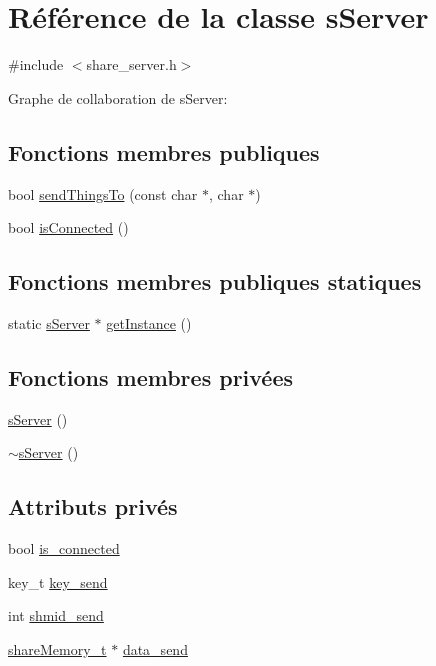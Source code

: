 \hypertarget{classs_server}{\section{Référence de la classe s\-Server}
\label{classs_server}
}


{\ttfamily \#include $<$share\-\_\-server.\-h$>$}



Graphe de collaboration de s\-Server\-:
\subsection*{Fonctions membres publiques}
\begin{DoxyCompactItemize}
\item 
bool \hyperlink{classs_server_abcd4016d1b93c045f0847a48afee0ac2}{send\-Things\-To} (const char $\ast$, char $\ast$)
\item 
bool \hyperlink{classs_server_a62561438ad0563d99bf05e84795807f9}{is\-Connected} ()
\end{DoxyCompactItemize}
\subsection*{Fonctions membres publiques statiques}
\begin{DoxyCompactItemize}
\item 
static \hyperlink{classs_server}{s\-Server} $\ast$ \hyperlink{classs_server_af98a4a292c1beaab9296a88dba9f0c13}{get\-Instance} ()
\end{DoxyCompactItemize}
\subsection*{Fonctions membres privées}
\begin{DoxyCompactItemize}
\item 
\hyperlink{classs_server_ade1889963bc8ec1d6c184f900f1c4977}{s\-Server} ()
\item 
\hyperlink{classs_server_a1c9ed39e48d26a4ed531741979ced7bd}{$\sim$s\-Server} ()
\end{DoxyCompactItemize}
\subsection*{Attributs privés}
\begin{DoxyCompactItemize}
\item 
bool \hyperlink{classs_server_adeee5a2ac165a0d9df35757d2ddfc70d}{is\-\_\-connected}
\item 
key\-\_\-t \hyperlink{classs_server_a9300a483fb708e2e0208d5e1e53e0c97}{key\-\_\-send}
\item 
int \hyperlink{classs_server_ab7c99a899b82ac73c36c30da01ab7944}{shmid\-\_\-send}
\item 
\hyperlink{share__server_8h_ad73ea60fc164d7d224a2499bd77a1f35}{share\-Memory\-\_\-t} $\ast$ \hyperlink{classs_server_ad24c799f06a327db74a17fd30c78eff5}{data\-\_\-send}
\end{DoxyCompactItemize}
